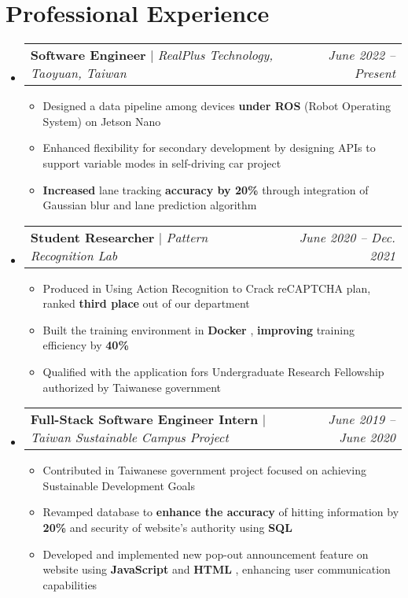 \documentclass[letterpaper,11pt]{article}
\makeatletter
\newcommand{\HL}[1]{
  \textbf{\textcolor{DukeBlue}{#1}}
}
\newcommand{\subheadingtitlevspace}{
\vspace{-3pt}
}
\newcommand{\resumeItem}[1]{
  \item{
    {#1 \vspace{-4pt}}
  }
}
\newcommand{\titleItem}[1]{
  \textbf{#1}
}
\newcommand{\resumeProjectHeading}[2]{
    \item
    \begin{tabular*}{0.97\textwidth}{l@{\extracolsep{\fill}}r}
      #1 & \textit{ #2} \\
    \end{tabular*}\vspace{-9pt}
}
\newcommand{\resumeSubHeadingListStart}{\subheadingtitlevspace\begin{itemize}[leftmargin=0.15in, label={}]}
\newcommand{\resumeSubHeadingListEnd}{\end{itemize}}
\newcommand{\resumeItemListStart}{
\begin{itemize}}
\newcommand{\resumeItemListEnd}{
\end{itemize}\vspace{-8pt}}
\makeatother
\begin{document}
   

\section{Professional Experience}
  \resumeSubHeadingListStart
    \resumeProjectHeading
      {\titleItem{{Software Engineer}} $|$ \emph{RealPlus Technology, Taoyuan, Taiwan}}{June 2022 -- Present}
    \resumeItemListStart
      \resumeItem{Designed a data pipeline among devices \HL{under ROS} (Robot Operating System) on Jetson Nano }
      \resumeItem{Enhanced flexibility for secondary development by designing APIs to support variable modes in self-driving car project }
      \resumeItem{\HL{Increased} lane tracking \HL{accuracy by 20\%} through integration of Gaussian blur and lane prediction algorithm}
    \resumeItemListEnd
    \resumeProjectHeading
      {\titleItem{{Student Researcher}}$|$ \emph{Pattern Recognition Lab}}{June 2020 -- Dec. 2021}
    \resumeItemListStart
      \resumeItem{Produced in Using Action Recognition to Crack reCAPTCHA plan, ranked \HL{third place} out of our department}
      \resumeItem{Built the training environment in \HL{Docker}, \HL{improving} training efficiency by \HL{40\%}}
      \resumeItem{Qualified with the application fors Undergraduate Research Fellowship authorized by Taiwanese government}
    \resumeItemListEnd
    \resumeProjectHeading
      {\titleItem{{Full-Stack Software Engineer Intern}}$|$ \emph{Taiwan Sustainable Campus Project} }{June 2019 -- June 2020}
    \resumeItemListStart
      \resumeItem{Contributed in Taiwanese government project focused on achieving Sustainable Development Goals}
      \resumeItem{Revamped database to \HL{enhance the accuracy} of hitting information by \HL{20\%} and security of website’s authority using \HL{SQL}}
      \resumeItem{Developed and implemented new pop-out announcement feature on website using \HL{JavaScript} and \HL{HTML}, enhancing user communication capabilities}
    \resumeItemListEnd
  \resumeSubHeadingListEnd


\end{document}
